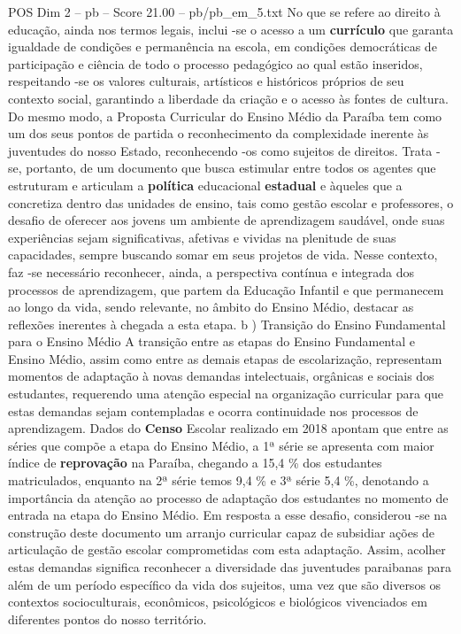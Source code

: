 \begin{textsample}{POS Dim 2 – pb – Score 21.00 – pb/pb\_em\_5.txt}
No que se refere ao direito à educação, ainda nos termos legais, inclui -se o acesso a um \textbf{currículo} que garanta igualdade de condições e permanência na escola, em condições democráticas de participação e ciência de todo o processo pedagógico ao qual estão inseridos, respeitando -se os valores culturais, artísticos e históricos próprios de seu contexto social, garantindo a liberdade da criação e o acesso às fontes de cultura.
Do mesmo modo, a Proposta Curricular do Ensino Médio da Paraíba tem como um dos seus pontos de partida o reconhecimento da complexidade inerente às juventudes do nosso Estado, reconhecendo -os como sujeitos de direitos.
Trata -se, portanto, de um documento que busca estimular entre todos os agentes que estruturam e articulam a \textbf{política} educacional \textbf{estadual} e àqueles que a concretiza dentro das unidades de ensino, tais como gestão escolar e professores, o desafio de oferecer aos jovens um ambiente de aprendizagem saudável, onde suas experiências sejam significativas, afetivas e vividas na plenitude de suas capacidades, sempre buscando somar em seus projetos de vida.
Nesse contexto, faz -se necessário reconhecer, ainda, a perspectiva contínua e integrada dos processos de aprendizagem, que partem da Educação Infantil e que permanecem ao longo da vida, sendo relevante, no âmbito do Ensino Médio, destacar as reflexões inerentes à chegada a esta etapa. b ) Transição do Ensino Fundamental para o Ensino Médio A transição entre as etapas do Ensino Fundamental e Ensino Médio, assim como entre as demais etapas de escolarização, representam momentos de adaptação à novas demandas intelectuais, orgânicas e sociais dos estudantes, requerendo uma atenção especial na organização curricular para que estas demandas sejam contempladas e ocorra continuidade nos processos de aprendizagem.
Dados do \textbf{Censo} Escolar realizado em 2018 apontam que entre as séries que compõe a etapa do Ensino Médio, a 1ª série se apresenta com maior índice de \textbf{reprovação} na Paraíba, chegando a 15,4 \% dos estudantes matriculados, enquanto na 2ª série temos 9,4 \% e 3ª série 5,4 \%, denotando a importância da atenção ao processo de adaptação dos estudantes no momento de entrada na etapa do Ensino Médio.
Em resposta a esse desafio, considerou -se na construção deste documento um arranjo curricular capaz de subsidiar ações de articulação de gestão escolar comprometidas com esta adaptação.
Assim, acolher estas demandas significa reconhecer a diversidade das juventudes paraibanas para além de um período específico da vida dos sujeitos, uma vez que são diversos os contextos socioculturais, econômicos, psicológicos e biológicos vivenciados em diferentes pontos do nosso território.

\end{textsample}
